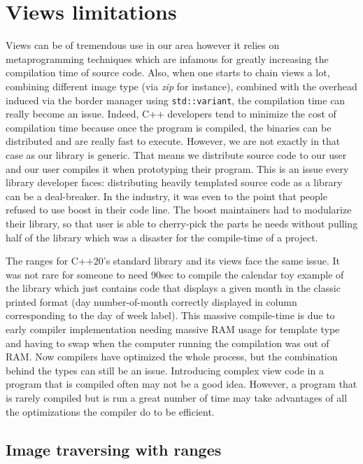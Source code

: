 \section{Views limitations}

Views can be of tremendous use in our area however it relies on metaprogramming techniques which are infamous for
greatly increasing the compilation time of source code. Also, when one starts to chain views a lot, combining different
image type (via \emph{zip} for instance), combined with the overhead induced via the border manager using
\texttt{std::variant}, the compilation time can really become an issue. Indeed, C++ developers tend to minimize the cost
of compilation time because once the program is compiled, the binaries can be distributed and are really fast to
execute. However, we are not exactly in that case as our library is generic. That means we distribute source code to our
user and our user compiles it when prototyping their program. This is an issue every library developer faces:
distributing heavily templated source code as a library can be a deal-breaker. In the industry, it was even to the point
that people refused to use boost in their code line. The boost maintainers had to modularize their library, so that user
is able to cherry-pick the parts he needs without pulling half of the library which was a disaster for the compile-time
of a project.

The ranges for C++20's standard library and its views face the same issue. It was not rare for someone to need 90sec to
compile the calendar toy example of the library which just contains code that displays a given month in the classic
printed format (day number-of-month correctly displayed in column corresponding to the day of week label). This massive
compile-time is due to early compiler implementation needing massive RAM usage for template type and having to swap when
the computer running the compilation was out of RAM. Now compilers have optimized the whole process, but the combination
behind the types can still be an issue. Introducing complex view code in a program that is compiled often may not be a
good idea. However, a program that is rarely compiled but is run a great number of time may take advantages of all the
optimizations the compiler do to be efficient.

\subsection{Image traversing with ranges}
\label{subsec.range.traversing}

